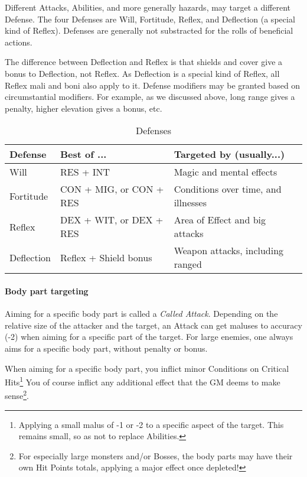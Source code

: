 Different Attacks, Abilities, and more generally hazards, may target a different Defense. The four Defenses are Will, Fortitude, Reflex, and Deflection (a special kind of Reflex). Defenses are generally not substracted for the rolls of beneficial actions. 

The difference between Deflection and Reflex is that shields and cover give a bonus to Deflection, not Reflex. As Deflection is a special kind of Reflex, all Reflex mali and boni also apply to it. Defense modifiers may be granted based on circumstantial modifiers. For example, as we discussed above, long range gives a penalty, higher elevation gives a bonus, etc.

\begin{table*}[h!tbp]
	\begin{center}
		\begin{tabular}{p{2cm}p{5cm}p{7cm}} \toprule
			
		    \textbf{Defense} & \textbf{Best of ...} & \textbf{Targeted by (usually...)} \\ \midrule

		    Will & RES + INT & Magic and mental effects \\
		    Fortitude & CON + MIG, or CON + RES & Conditions over time, and illnesses \\
		    Reflex & DEX + WIT, or DEX + RES & Area of Effect and big attacks \\
		    Deflection & Reflex + Shield bonus & Weapon attacks, including ranged \\

		    \bottomrule
		\end{tabular}
	\end{center}
	\caption{Defenses}
  \label{defenses_table}
\end{table*}


\paragraph{Body part targeting} 

\label{called_shot}

Aiming for a specific body part is called a \textit{Called Attack}. Depending on the relative size of the attacker and the target, an Attack can get maluses to accuracy (-2) when aiming for a specific part of the target. For large enemies, one always aims for a specific body part, without penalty or bonus.

When aiming for a specific body part, you inflict minor Conditions on Critical Hits\footnote{Applying a small malus of -1 or -2 to a specific aspect of the target. This remains small, so as not to replace Abilities.} You of course inflict any additional effect that the GM deems to make sense\footnote{For especially large monsters and/or Bosses, the body parts may have their own Hit Points totals, applying a major effect once depleted!}.

